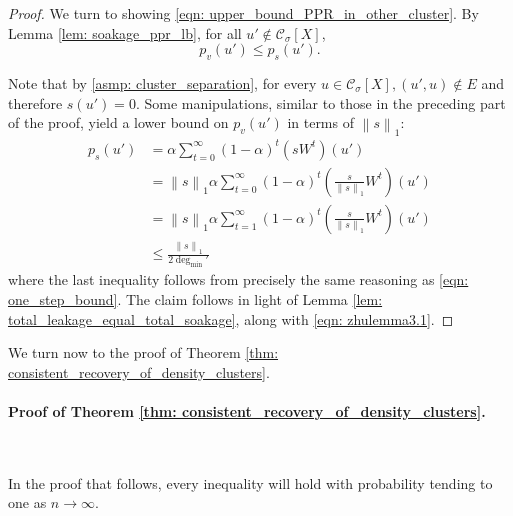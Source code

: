 \documentclass[11pt,twoside]{article}
\newcommand{\norm}[1]{\left\lVert#1\right\rVert}
\newcommand{\1}{\mathbf{1}}
\newcommand{\pbf}{p}        %
\newcommand{\Xbf}{X}             %
\newcommand{\Wbf}{W}
\newcommand{\Cset}{\mathcal{C}}
\newcommand{\Csig}{\Cset_{\sigma}}
\newcommand{\degminpr}{\deg_{\min}'}
\begin{document}
\begin{proof}
	We turn to showing \eqref{eqn: upper_bound_PPR_in_other_cluster}. By Lemma \ref{lem: soakage_ppr_lb}, for all $u' \not\in \Csig[\Xbf]$,
	\begin{equation*}
	\pbf_v(u') \leq \pbf_s(u').
	\end{equation*}
	
	Note that by \ref{asmp: cluster_separation}, for every $u \in \Csig[\Xbf], (u',u) \not\in E$ and therefore $s(u') = 0$. Some manipulations, similar to those in the preceding part of the proof, yield a lower bound on $\pbf_v(u')$ in terms of $\norm{s}_1$:
	\begin{align*}
	\pbf_s(u') & = \alpha \sum_{t = 0}^{\infty} (1 - \alpha)^t \left(s \Wbf^t\right)(u') \\
	& = \norm{s}_1 \alpha \sum_{t = 0}^{\infty} (1 - \alpha)^t \left(\frac{s}{\norm{s}_1} \Wbf^t\right)(u') \\
	& = \norm{s}_1 \alpha \sum_{t = 1}^{\infty} (1 - \alpha)^t \left(\frac{s}{\norm{s}_1} \Wbf^t\right)(u') \\
	& \leq \frac{\norm{s}_1}{2\degminpr}
	\end{align*}
	where the last inequality follows from precisely the same reasoning as \eqref{eqn: one_step_bound}. The claim follows in light of Lemma \ref{lem: total_leakage_equal_total_soakage}, along with \eqref{eqn: zhulemma3.1}.
\end{proof}


We turn now to the proof of Theorem \ref{thm: consistent_recovery_of_density_clusters}.

\paragraph{Proof of Theorem \ref{thm: consistent_recovery_of_density_clusters}.}
~

In the proof that follows, every inequality will hold with probability tending to one as $n \to \infty$.
\end{document}
